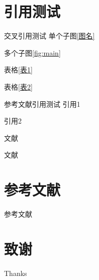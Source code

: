 \documentclass[11pt, aspectratio=169, UTF8, fontset=none]{ctexbeamer}
\begin{document}
\section{引用测试}

\begin{frame}{交叉引用测试}
    单个子图\ref{图名}

    多个子图\ref{fig:main}

    表格\ref{表1}

    表格\ref{表2}
\end{frame}

\begin{frame}{参考文献引用测试}
  引用1\cite{ref1}

  引用2\cite{ref2}

  文献\parencite{ref1}

  文献\parencite{ref2}
\end{frame}

\section*{参考文献}
\begin{frame}[allowframebreaks]{参考文献}
  \printbibliography
\end{frame}

\section*{致谢}
\begin{frame}
  \begin{center}
    {\Huge Thanks} \\
  \end{center}
\end{frame}
\end{document}
